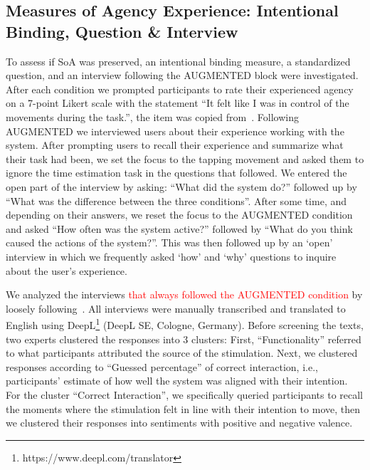 
\subsection{Measures of Agency Experience: Intentional Binding, Question \& Interview}
To assess if SoA was preserved, an intentional binding measure, a standardized question, and an interview following the AUGMENTED block were investigated. After each condition we prompted participants to rate their experienced agency on a 7-point Likert scale with the statement ``It felt like I was in control of the movements during the task.'', the item was copied from~\cite{Bergstrom2022-fb}. Following AUGMENTED we interviewed users about their experience working with the system. After prompting users to recall their experience and summarize what their task had been, we set the focus to the tapping movement and asked them to ignore the time estimation task in the questions that followed. We entered the open part of the interview by asking: ``What did the system do?'' followed up by ``What was the difference between the three conditions''. After some time, and depending on their answers, we reset the focus to the AUGMENTED condition and asked ``How often was the system active?'' followed by ``What do you think caused the actions of the system?''. This was then followed up by an `open' interview in which we frequently asked `how' and `why' questions to inquire about the user's experience.

We analyzed the interviews \textcolor{red}{that always followed the AUGMENTED condition} by loosely following~\citet{Mayring2015-pp}. All interviews were manually transcribed and translated to English using DeepL\footnote{https://www.deepl.com/translator} (DeepL SE, Cologne, Germany). Before screening the texts, two experts clustered the responses into 3 clusters: First, ``Functionality'' referred to what participants attributed the source of the stimulation. Next, we clustered responses according to ``Guessed percentage'' of correct interaction, i.e., participants' estimate of how well the system was aligned with their intention. For the cluster ``Correct Interaction'', we specifically queried participants to recall the moments where the stimulation felt in line with their intention to move, then we clustered their responses into sentiments with positive and negative valence. 

